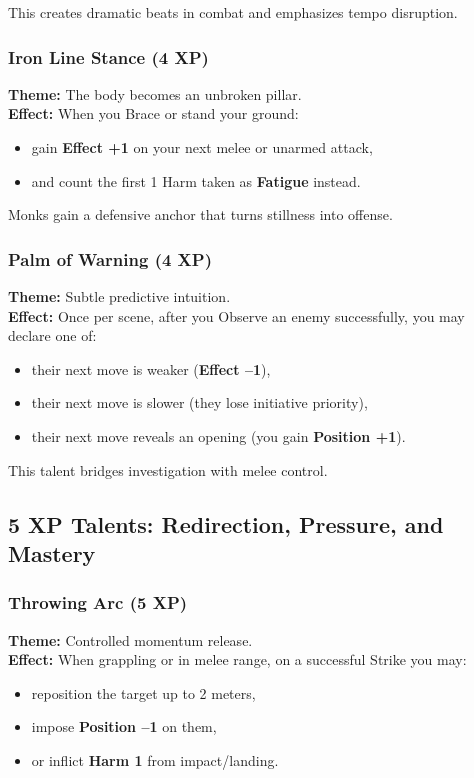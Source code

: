 \documentclass[11pt]{book}
\begin{document}
This creates dramatic beats in combat and emphasizes tempo disruption.

\subsubsection{Iron Line Stance (4 XP)}
\textbf{Theme:} The body becomes an unbroken pillar.\\
\textbf{Effect:} When you Brace or stand your ground:
\begin{itemize}
  \item gain \textbf{Effect +1} on your next melee or unarmed attack,
  \item and count the first 1 Harm taken as \textbf{Fatigue} instead.
\end{itemize}

Monks gain a defensive anchor that turns stillness into offense.

\subsubsection{Palm of Warning (4 XP)}
\textbf{Theme:} Subtle predictive intuition.\\
\textbf{Effect:} Once per scene, after you Observe an enemy successfully,
you may declare one of:
\begin{itemize}
  \item their next move is weaker (\textbf{Effect --1}),
  \item their next move is slower (they lose initiative priority),
  \item their next move reveals an opening (you gain \textbf{Position +1}).
\end{itemize}

This talent bridges investigation with melee control.

\subsection{5 XP Talents: Redirection, Pressure, and Mastery}

\subsubsection{Throwing Arc (5 XP)}
\textbf{Theme:} Controlled momentum release.\\
\textbf{Effect:} When grappling or in melee range,
on a successful Strike you may:
\begin{itemize}
  \item reposition the target up to 2 meters,
  \item impose \textbf{Position --1} on them,
  \item or inflict \textbf{Harm 1} from impact/landing.
\end{itemize}
\end{document}
